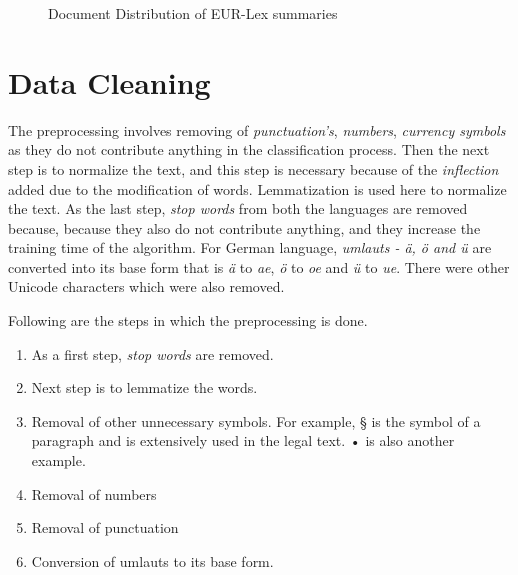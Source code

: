 \begin{figure}[!ht]
      \captionsetup{justification=centering,margin=1cm}
      \caption{Document Distribution of EUR-Lex summaries}
    \label{fig:dataimbalance}
\end{figure}

\section{Data Cleaning}
The preprocessing involves removing of \textit{punctuation's}, \textit{numbers}, \textit{currency symbols} as they do not contribute anything in the classification process. Then the next step is to normalize the text, and this step is necessary because of the \textit{inflection} added due to the modification of words. Lemmatization is used here to normalize the text. As the last step, \textit{stop words} from both the languages are removed because, because they also do not contribute anything, and they increase the training time of the algorithm. For German language, \textit{umlauts - ä, ö and ü} are converted into its base form that is \textit{ä} to \textit{ae}, \textit{ö} to \textit{oe} and \textit{ü} to \textit{ue}. There were other Unicode characters which were also removed.

Following are the steps in which the preprocessing is done.

\begin{enumerate}
    \item As a first step, \textit{stop words} are removed.
    \item Next step is to lemmatize the words.
    \item Removal of other unnecessary symbols. For example, § is the symbol of a paragraph and is extensively used in the legal text. • is also another example.
    \item Removal of numbers
    \item Removal of punctuation 
    \item Conversion of umlauts to its base form.
\end{enumerate}


